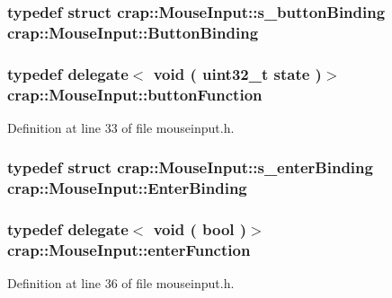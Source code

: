 \subsubsection[{Button\+Binding}]{\setlength{\rightskip}{0pt plus 5cm}typedef struct {\bf crap\+::\+Mouse\+Input\+::s\+\_\+button\+Binding}
	 {\bf crap\+::\+Mouse\+Input\+::\+Button\+Binding}}\label{classcrap_1_1_mouse_input_a4aef04436121adc836ded20bfe36d967}
\hypertarget{classcrap_1_1_mouse_input_ae29f008887cdeda02cb0a8bbac759f52}{}
\subsubsection[{button\+Function}]{\setlength{\rightskip}{0pt plus 5cm}typedef {\bf delegate}$<$ void ( uint32\+\_\+t state )$>$ {\bf crap\+::\+Mouse\+Input\+::button\+Function}}\label{classcrap_1_1_mouse_input_ae29f008887cdeda02cb0a8bbac759f52}


Definition at line 33 of file mouseinput.\+h.

\hypertarget{classcrap_1_1_mouse_input_a3616aed9af2333779cc502d22764f540}{}
\subsubsection[{Enter\+Binding}]{\setlength{\rightskip}{0pt plus 5cm}typedef struct {\bf crap\+::\+Mouse\+Input\+::s\+\_\+enter\+Binding}
	 {\bf crap\+::\+Mouse\+Input\+::\+Enter\+Binding}}\label{classcrap_1_1_mouse_input_a3616aed9af2333779cc502d22764f540}
\hypertarget{classcrap_1_1_mouse_input_a1fb324bddbf07f2a44cb0f98c7bc11e4}{}
\subsubsection[{enter\+Function}]{\setlength{\rightskip}{0pt plus 5cm}typedef {\bf delegate}$<$ void ( bool )$>$ {\bf crap\+::\+Mouse\+Input\+::enter\+Function}}\label{classcrap_1_1_mouse_input_a1fb324bddbf07f2a44cb0f98c7bc11e4}


Definition at line 36 of file mouseinput.\+h.

